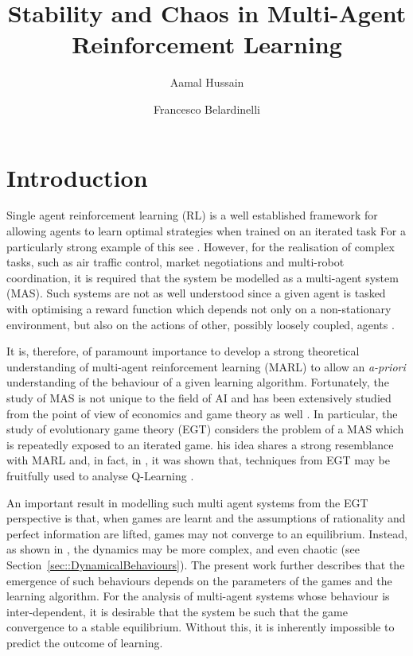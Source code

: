 \documentclass[sigconf,anonymous]{aamas}
\title[InstabilityinMARL]{Stability and Chaos in Multi-Agent Reinforcement Learning}
\author{Aamal Hussain}
\affiliation{
  \department{Department of Computing}
  \institution{Imperial College London}}
\author{Francesco Belardinelli}
\affiliation{
  \department{Department of Computing}
  \institution{Imperial College London}}
\begin{document}

\pagestyle{fancy}
\fancyhead{}


\maketitle 


\section{Introduction}

Single agent reinforcement learning (RL) is a well established framework for allowing agents to learn optimal strategies when trained on an iterated task 
For a particularly strong example of this see \cite{Vinyals2019}. However, for the realisation of complex tasks, such as air traffic control, market negotiations and multi-robot coordination, it is required that the system be modelled as a multi-agent system (MAS). Such systems are not as well understood since a given agent is tasked with optimising a reward function which depends not only on a non-stationary environment, but also on the actions of other, possibly loosely coupled, agents \cite{SchwartzMulti-agentApproach}. 

It is, therefore, of paramount importance to develop a strong theoretical understanding of multi-agent reinforcement learning (MARL) to allow an {\em a-priori} understanding of the behaviour of a given learning algorithm. Fortunately, the study of MAS is not unique to the field of AI and has been extensively studied from the point of view of economics and game theory as well \cite{ShohamMultiagentFoundations}. In particular, the study of evolutionary game theory (EGT) considers the problem of a MAS which is repeatedly exposed to an iterated game. 
his idea shares a strong resemblance with MARL and, in fact, in \cite{Tuyls2006AnGames}, it was shown that, techniques from EGT may be fruitfully used to analyse Q-Learning \cite{Sutton2018}.

An important result in modelling such multi agent systems from the EGT perspective is that, when games are learnt and the assumptions of rationality and perfect information are lifted, games may not converge to an equilibrium. Instead, as shown in \cite{Sanders2018}, the dynamics may be more complex, and even chaotic (see Section~\ref{sec::DynamicalBehaviours}). The present work further describes that the emergence of such behaviours depends on the parameters of the games and the learning algorithm. For the analysis of multi-agent systems whose behaviour is inter-dependent, it is desirable that the system be such that the game convergence to a stable equilibrium. Without this, it is inherently impossible to predict the outcome of learning.  
\end{document}
